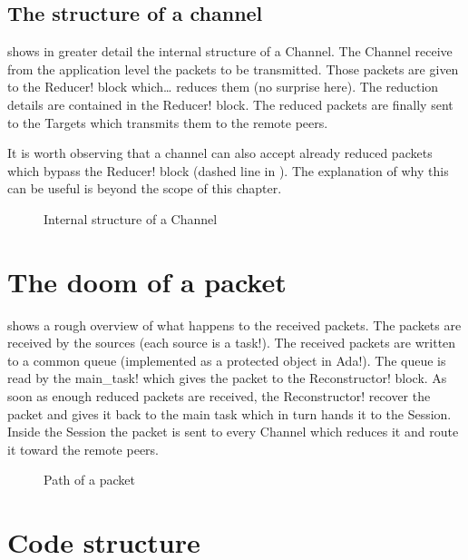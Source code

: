 \documentclass[a4paper]{medusabook}
\begin{document}
\subsection{The structure of a channel}
\label{sub:0.1.0;overview}

 shows in greater detail the internal structure of a
Channel.  The Channel receive from the application level the packets
to be transmitted.  Those packets are given to the \ttt Reducer! block
which\ldots{} reduces them (no surprise here).  The reduction details
are contained in the \ttt Reducer! block.  The reduced packets are
finally sent to the Targets which transmits them to the remote peers.

It is worth observing that a channel can also accept already reduced
packets which bypass the \ttt Reducer! block (dashed line in
).  The explanation of why this can be useful is beyond
the scope of this chapter.

\begin{figure}
\centerline{}
\caption{Internal structure of a Channel
\label{fig:channel}}
\end{figure}
%

\section{The doom of a packet}
\label{sect:0.0;overview}

 shows a rough overview of what happens to the
received packets.  The packets are received by the sources (each
source is a \ttt task!).  The received packets are written to a common
queue (implemented as a protected object in \ttt Ada!). The queue is
read by the \ttt main_task! which gives the packet to the \ttt
Reconstructor! block.  As soon as enough reduced packets are received,
the \ttt Reconstructor! recover the packet and gives it back to the
main task which in turn hands it to the Session.  
Inside the Session the packet is sent to every Channel which reduces
it and route it toward the remote peers.

\begin{figure}
\centerline{}
\caption{Path of a packet
\label{fig:main_task}}
\end{figure}
%
\section{Code structure}
\label{sect:0.2;overview}
\end{document}
